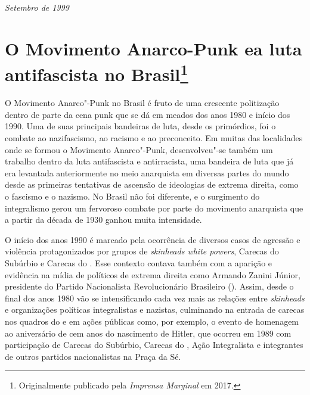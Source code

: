 
\hfill{}\emph{Setembro de 1999}


\chapter[O Movimento Anarco-Punk e a luta antifascista no Brasil]{O Movimento Anarco-Punk e\break a luta antifascista no Brasil\footnote[*]{Originalmente publicado pela \emph{Imprensa Marginal} em 2017.}}

O Movimento Anarco"-Punk no Brasil é fruto de uma crescente politização dentro de parte da cena punk que se dá em meados dos anos 1980 e início dos 1990. Uma de suas principais bandeiras de luta, desde os primórdios, foi o combate ao nazifascismo, ao racismo e ao preconceito. Em muitas das localidades onde se formou o Movimento Anarco"-Punk, desenvolveu"-se também um trabalho dentro da luta antifascista e antirracista, uma bandeira de luta que já era levantada anteriormente no meio anarquista em diversas partes do mundo desde as primeiras tentativas de ascensão de ideologias de extrema direita, como o fascismo e o nazismo. No Brasil não foi diferente, e o surgimento do integralismo gerou um fervoroso combate por parte do movimento anarquista que a partir da década de 1930 ganhou muita intensidade.

O início dos anos 1990 é marcado pela ocorrência de diversos casos de agressão e violência protagonizados por grupos de \emph{skinheads white powers}, Carecas do Subúrbio e Carecas do . Esse contexto contava também com a aparição e evidência na mídia de políticos de extrema direita como Armando Zanini Júnior, presidente do Partido Nacionalista Revolucionário Brasileiro (). Assim, desde o final dos anos 1980 vão se intensificando cada vez mais as relações entre \emph{skinheads} e organizações políticas integralistas e nazistas, culminando na entrada de carecas nos quadros do  e em ações públicas como, por exemplo, o evento de homenagem ao aniversário de cem anos do nascimento de Hitler, que ocorreu em 1989 com participação de Carecas do Subúrbio, Carecas do , Ação Integralista e integrantes de outros partidos nacionalistas na Praça da Sé.


